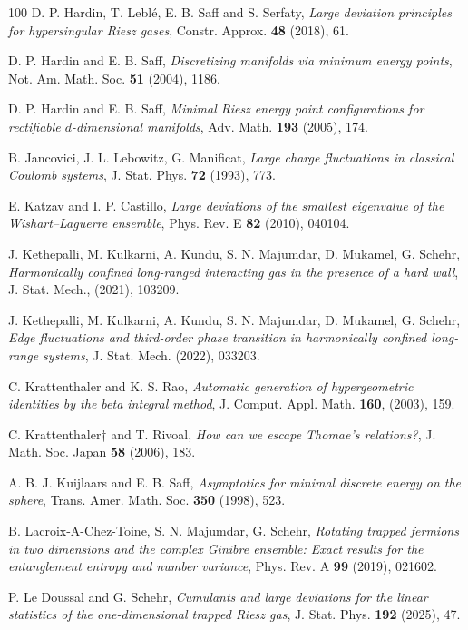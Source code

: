 \documentclass[10pt]{amsart}
\theoremstyle{plain}
\theoremstyle{remark}
\numberwithin{equation}{section}
\begin{document}
\begin{thebibliography}{100}
 D. P. Hardin, T. Lebl{\'e}, E. B. Saff and S. Serfaty, {\it Large deviation principles for hypersingular Riesz gases}, Constr. Approx. {\bf 48} (2018), 61.

 D. P. Hardin and E. B. Saff, \emph{Discretizing manifolds via minimum energy points}, Not. Am. Math. Soc. \textbf{51} (2004), 1186.%

 D. P. Hardin and E. B. Saff, \emph{Minimal Riesz energy point configurations for rectifiable $d$-dimensional manifolds}, Adv. Math. \textbf{193} (2005), 174.%

B. Jancovici, J. L. Lebowitz, G. Manificat, {\it Large charge fluctuations in classical Coulomb systems}, J. Stat. Phys. {\bf 72} (1993), 773.





 E. Katzav and I. P. Castillo, \emph{Large deviations of the smallest eigenvalue of the Wishart–Laguerre ensemble}, Phys. Rev. E \textbf{82} (2010), 040104.

J. Kethepalli, M. Kulkarni, A. Kundu, S. N. Majumdar, D. Mukamel, G. Schehr, \emph{Harmonically confined long-ranged interacting gas in the presence of a hard wall}, J. Stat. Mech., (2021), 103209.

J. Kethepalli, M. Kulkarni, A. Kundu, S. N. Majumdar, D. Mukamel, G. Schehr, \emph{Edge fluctuations and third-order phase transition in harmonically confined long-range systems}, J. Stat. Mech. (2022), 033203.


 C. Krattenthaler and K. S. Rao, \emph{Automatic generation of hypergeometric identities by the beta integral method}, J.  Comput. Appl. Math. \textbf{160}, (2003), 159.%

 C. Krattenthaler† and T. Rivoal, \emph{How can we escape Thomae’s relations?}, J. Math. Soc. Japan \textbf{58} (2006), 183.%

  A. B. J. Kuijlaars and E. B. Saff, \emph{Asymptotics for minimal discrete energy on the sphere}, Trans. Amer. Math. Soc. \textbf{350} (1998), 523.%

B. Lacroix-A-Chez-Toine, S. N. Majumdar, G. Schehr, {\it Rotating trapped fermions in two dimensions and the complex Ginibre ensemble: Exact results for the entanglement entropy and number variance}, Phys. Rev. A {\bf 99} (2019), {021602}.


 P. Le Doussal and G. Schehr, \emph{Cumulants and large deviations for the linear statistics of the one-dimensional trapped Riesz gas}, J. Stat. Phys. \textbf{192} (2025), 47.


\end{thebibliography}
\end{document}
